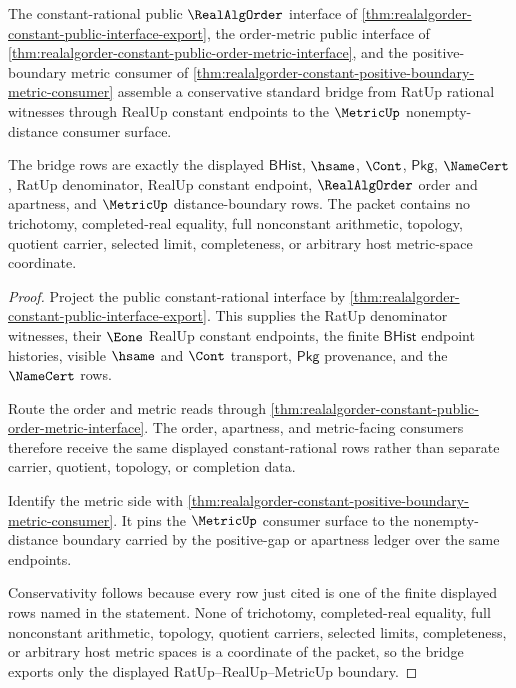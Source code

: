\begin{theorem}
\label{thm:realalgorder-constant-rational-standard-bridge-boundary}
The constant-rational public $\RealAlgOrder$ interface of
\autoref{thm:realalgorder-constant-public-interface-export}, the
order-metric public interface of
\autoref{thm:realalgorder-constant-public-order-metric-interface}, and the
positive-boundary metric consumer of
\autoref{thm:realalgorder-constant-positive-boundary-metric-consumer}
assemble a conservative standard bridge from RatUp rational witnesses through
RealUp constant endpoints to the $\MetricUp$ nonempty-distance consumer
surface.

The bridge rows are exactly the displayed $\mathsf{BHist}$, $\hsame$,
$\Cont$, $\mathsf{Pkg}$, $\NameCert$, RatUp denominator, RealUp constant
endpoint, $\RealAlgOrder$ order and apartness, and $\MetricUp$
distance-boundary rows. The packet contains no trichotomy, completed-real
equality, full nonconstant arithmetic, topology, quotient carrier, selected
limit, completeness, or arbitrary host metric-space coordinate.
\end{theorem}
\begin{proof}
Project the public constant-rational interface by
\autoref{thm:realalgorder-constant-public-interface-export}. This supplies the
RatUp denominator witnesses, their $\Eone$ RealUp constant endpoints, the
finite $\mathsf{BHist}$ endpoint histories, visible $\hsame$ and $\Cont$
transport, $\mathsf{Pkg}$ provenance, and the $\NameCert$ rows.

Route the order and metric reads through
\autoref{thm:realalgorder-constant-public-order-metric-interface}. The order,
apartness, and metric-facing consumers therefore receive the same displayed
constant-rational rows rather than separate carrier, quotient, topology, or
completion data.

Identify the metric side with
\autoref{thm:realalgorder-constant-positive-boundary-metric-consumer}. It
pins the $\MetricUp$ consumer surface to the nonempty-distance boundary
carried by the positive-gap or apartness ledger over the same endpoints.

Conservativity follows because every row just cited is one of the finite
displayed rows named in the statement. None of trichotomy, completed-real
equality, full nonconstant arithmetic, topology, quotient carriers, selected
limits, completeness, or arbitrary host metric spaces is a coordinate of the
packet, so the bridge exports only the displayed RatUp--RealUp--MetricUp
boundary.
\end{proof}

